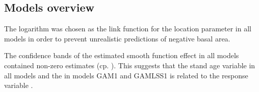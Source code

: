 \subsection{Models overview}

The logarithm was chosen as the link function for the location parameter in all models in order to prevent unrealistic predictions of negative basal area.

The confidence bands of the estimated smooth function effect in all models contained non-zero estimates (cp. ).  This suggests that the stand age variable in all models and the \ProductivityIndexVariableText{} in models GAM1 and GAMLSS1 is related to the response variable \parencite{Wood2001}.

